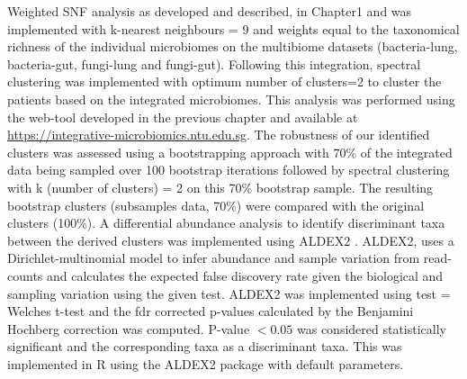 Weighted SNF analysis as developed and described, in Chapter1 and \cite{Narayana2019} was implemented with k-nearest neighbours = 9 and weights equal to the taxonomical richness of the individual microbiomes on the multibiome datasets (bacteria-lung, bacteria-gut, fungi-lung and fungi-gut). Following this integration, spectral clustering was implemented with optimum number of clusters=2 to cluster the patients based on the integrated microbiomes. This analysis was performed using the web-tool developed in the previous chapter and available at \url{https://integrative-microbiomics.ntu.edu.sg}. The robustness of our identified clusters was assessed using a bootstrapping approach with 70\% of the integrated data being sampled over 100 bootstrap iterations followed by spectral clustering with k (number of clusters) = 2 on this 70\% bootstrap sample. The resulting bootstrap clusters (subsamples data, 70\%) were compared with the original clusters (100\%). A differential abundance analysis to identify discriminant taxa between the derived clusters was implemented using ALDEX2 \cite{Fernandes2014}. ALDEX2, uses a Dirichlet-multinomial model to infer abundance and sample variation from read-counts and calculates the expected false discovery rate given the biological and sampling variation using the given test. ALDEX2 was implemented using test =  Welches t-test and the fdr corrected p-values calculated by the Benjamini Hochberg correction was computed. P-value $< 0.05$ was considered statistically significant and the corresponding taxa as a discriminant taxa. This was implemented in R using the ALDEX2 package with default parameters.

